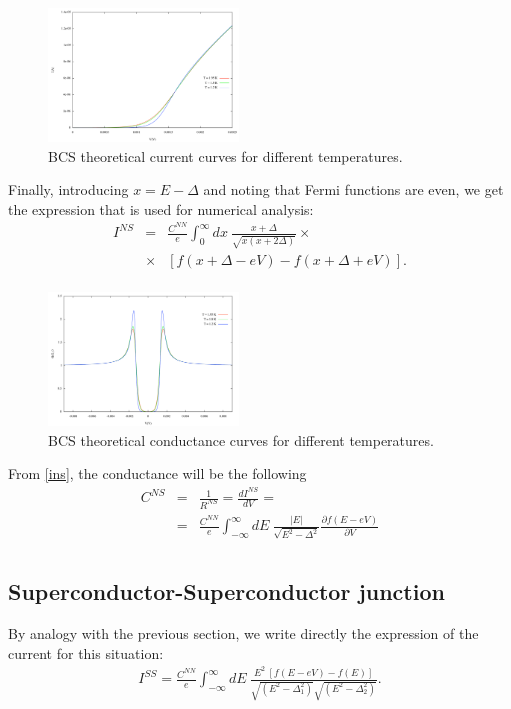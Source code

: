 \begin{figure}[t!]
\centering
\includegraphics[width=0.45\textwidth]{iv_theoretical_4-5-10}
\caption{\small BCS theoretical current curves for different temperatures. 
\label{iv_theoretical_4-5-10}}
\end{figure}


Finally, introducing $x=E-\Delta$ and noting that Fermi functions are even, we get the expression that is used for numerical analysis:
\begin{eqnarray}\label{ins_numerical}
I^{NS} &=& \frac{C^{NN}}{e} \int_{0}^{\infty} dx\ \frac{x+\Delta}{\sqrt{x(x+2 \Delta)}} \times
		\nonumber \\
		&\times& [f(x+ \Delta-eV)-f(x+ \Delta +eV)].
		\nonumber \\
\end{eqnarray}

\begin{figure}[h!]
\centering
\includegraphics[width=0.45\textwidth]{gv_theoretical_4-5-10}
\caption{\small BCS theoretical conductance curves for different temperatures.
\label{gv_theoretical_4-5-10}}
\end{figure}

From \eqref{ins}, the conductance will be the following
\begin{eqnarray}\label{cns}
C^{NS} &=& \frac{1}{R^{NS}} = \frac{dI^{NS}}{dV} =
		\nonumber \\
		&=& \frac{C^{NN}}{e} \int_{-\infty}^{\infty} dE\ \frac{|E|}{\sqrt{E^2-\Delta^2}} 
		\frac{\partial f(E-eV)}{\partial V}
		\nonumber \\
\end{eqnarray}

\subsection{Superconductor-Superconductor junction} 
By analogy with the previous section, we write directly the expression of the current for this situation:
\begin{eqnarray}\label{iss}
I^{SS} = \frac{C^{NN}}{e} \int_{-\infty}^{\infty} dE\ 
		\frac{E^2\ [f(E-eV)-f(E)]}{\sqrt{(E^2-\Delta_1 ^2)}\sqrt{(E^2-\Delta_2 ^2)}}.
		\nonumber \\
\end{eqnarray}
